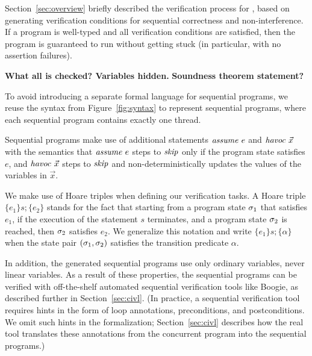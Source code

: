 

Section~\ref{sec:overview} briefly described the verification process for \civl, based on generating verification conditions for sequential correctness and non-interference.
If a program is well-typed and all verification conditions are satisfied, then the program is guaranteed to run without getting stuck (in particular, with no assertion failures). 

{\bf What all is checked? Variables hidden. }
{\bf Soundness theorem statement?}

To avoid introducing a separate formal language for sequential programs, we reuse the syntax from Figure~\ref{fig:syntax} to represent sequential programs, where each sequential program contains exactly one thread.

Sequential programs make use of additional statements  $\mathit{assume}\ e$ and $\mathit{havoc}\ \vec{x}$ with the semantics that $\mathit{assume}\ e$ steps to $\mathit{skip}$ only if the program state satisfies $e$, and $\mathit{havoc}\ \vec{x}$ steps to $\mathit{skip}$ and non-deterministically updates the values of the variables in $\vec{x}$. 

We make use of Hoare triples when defining our verification tasks. A Hoare triple $\{e_1\} s; \{e_2\}$ stands for the fact that starting from a program state $\sigma_1$ that satisfies $e_1$, if the execution of the statement $s$ terminates, and a program state $\sigma_2$ is reached, then $\sigma_2$ satisfies $e_2$. We generalize this notation and write $\{e_1\} s; \{\alpha\}$ when the state pair $(\sigma_1,\sigma_2)$ satisfies the transition predicate $\alpha$. 

In addition, the generated sequential programs use only ordinary variables, never linear variables.
As a result of these properties, the sequential programs can be verified with off-the-shelf automated sequential verification tools like Boogie, as described further in Section~\ref{sec:civl}.
(In practice, a sequential verification tool requires hints in the form of loop annotations, preconditions, and postconditions.
We omit such hints in the formalization; Section~\ref{sec:civl} describes how the real \civl tool translates these annotations from the concurrent program into the sequential programs.)

